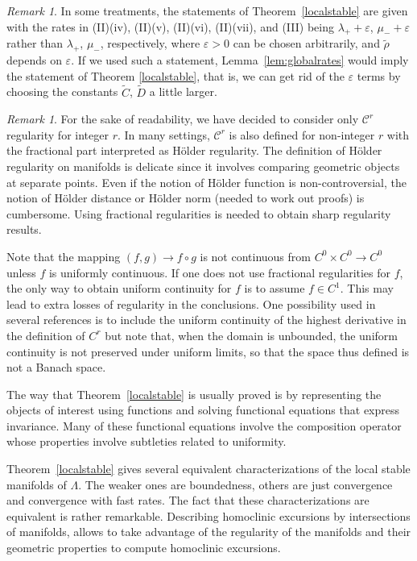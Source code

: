 \documentclass[11pt]{amsart}
\theoremstyle{definition}
\theoremstyle{remark}
\newtheorem{rem}[thm]{Remark}
\numberwithin{equation}{section}
\newcommand{\eps}{\varepsilon}
\newcommand{\C}{\mathcal{C}}
\begin{document}
\begin{rem}
In some treatments, the statements of Theorem~\ref{localstable} are given with the rates in (II)(iv), (II)(v), (II)(vi), (II)(vii),
and (III) being $\lambda_++\eps$, $\mu_-+\eps$ rather than $\lambda_+$, $\mu_- $, respectively, where $\eps>0$ can be chosen arbitrarily, and
$\tilde\rho$ depends on $\eps$. If we used such a statement, Lemma~\ref{lem:globalrates} would imply the statement of Theorem \ref{localstable},
that is, we can get rid of the $\eps$ terms by choosing the constants $\tilde C$, $\tilde D$ a little larger.
\end{rem}



\begin{rem} \label{subtleties}
For the sake of readability, we have decided
to consider only $\C^r$ regularity for integer $r$.
In many settings, $\C^r$ is also defined for non-integer $r$
with the fractional part interpreted as H\"older regularity.
The definition of H\"older regularity on manifolds is delicate
since it involves comparing geometric objects at separate points.
Even if the notion of H\"older function is non-controversial,
the notion of H\"older distance or H\"older norm  (needed
to work out proofs) is cumbersome.
Using fractional regularities is needed to obtain sharp regularity results.

Note that the mapping $(f,g) \rightarrow f\circ g$
is not continuous from $C^0 \times C^0 \rightarrow C^0$
unless $f$ is uniformly continuous.
If one does not use fractional regularities for $f$, the only way to obtain
uniform continuity for $f$ is to assume $f \in C^1$. This may lead
to extra losses of regularity in the conclusions.  One possibility used in several references
is to include the uniform continuity of the highest derivative
in the definition of $C^r$ but note that, when the domain is unbounded,
the uniform continuity is not preserved under uniform limits, so
that the space thus defined is not a Banach space.
\end{rem}




The way that Theorem~\ref{localstable} is usually proved is by
representing the  objects of interest  using functions
and solving functional equations that express invariance.
Many of these functional equations involve the composition operator
whose properties involve subtleties related to uniformity.



Theorem~\ref{localstable}  gives several equivalent  characterizations of the
local stable manifolds of $\Lambda$. The weaker ones are boundedness, others
are just convergence and  convergence with fast rates.
The fact that these characterizations are equivalent
is rather remarkable. Describing homoclinic excursions
by intersections of manifolds, allows to take advantage of the
regularity of the manifolds and their geometric properties to
compute homoclinic excursions.
\end{document}
